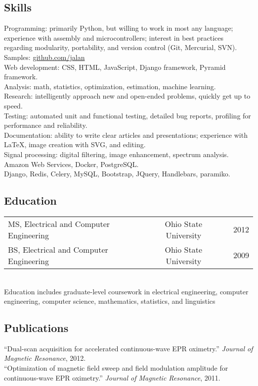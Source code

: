 \documentclass[12pt]{report}
\makeatletter
\renewcommand{\bullet}{$\vcenter{\hbox{~\huge$\cdot$~}}$}
\newenvironment{bullets}
{\tabularx{\textwidth}{ @{\bullet} X @{} }}
{\endtabularx}
\makeatother
\begin{document}
\subsection*{Skills}
\begin{bullets}
Programming: primarily Python, but willing to work in most any language; experience with assembly and microcontrollers; interest in best practices regarding modularity, portability, and version control (Git, Mercurial, SVN). Samples: \href{http://github.com/jalan}{github.com/jalan} \\
Web development: CSS, HTML, JavaScript, Django framework, Pyramid framework. \\
Analysis: math, statistics, optimization, estimation, machine learning. \\
Research: intelligently approach new and open-ended problems, quickly get up to speed. \\
Testing: automated unit and functional testing, detailed bug reports, profiling for performance and reliability. \\
Documentation: ability to write clear articles and presentations; experience with \LaTeX, image creation with SVG, and editing. \\
Signal processing: digital filtering, image enhancement, spectrum analysis. \\
Amazon Web Services, Docker, PostgreSQL. \\
Django, Redis, Celery, MySQL, Bootstrap, JQuery, Handlebars, paramiko. \\
\end{bullets}

\subsection*{Education}
\begin{tabularx}{\textwidth}{ @{\bullet} l X c X r @{} }
MS, Electrical and Computer Engineering && Ohio State University && 2012 \\
BS, Electrical and Computer Engineering && Ohio State University && 2009 \\
\end{tabularx}
\newline \\
Education includes graduate-level coursework in electrical engineering, computer engineering, computer science, mathematics, statistics, and linguistics

\subsection*{Publications}
\begin{bullets}
``Dual-scan acquisition for accelerated continuous-wave EPR oximetry.'' {\it Journal of Magnetic Resonance}, 2012. \\
``Optimization of magnetic field sweep and field modulation amplitude for continuous-wave EPR oximetry.'' {\it Journal of Magnetic Resonance}, 2011. \\
\end{bullets}
\end{document}
